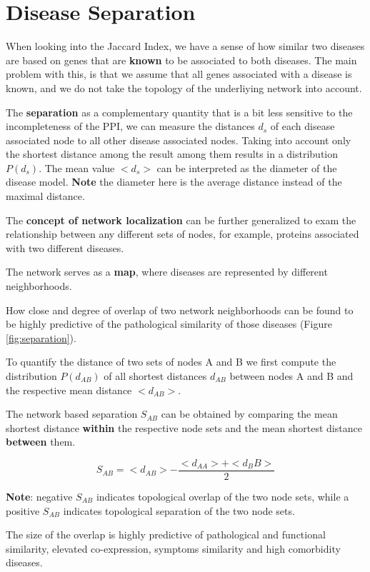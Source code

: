 \documentclass[
]{book}
\begin{document}
\hypertarget{dissep}{%
\section{Disease Separation}\label{dissep}}

When looking into the Jaccard Index, we have a sense of how similar two diseases are based on genes that are \textbf{known} to be associated to both diseases.
The main problem with this, is that we assume that all genes associated with a disease is known, and we do not take the topology of the underliying network into account.

The \textbf{separation} as a complementary quantity that is a bit less sensitive to the incompleteness of the PPI, we can measure the distances \(d_s\) of each disease associated node to all other disease associated nodes. Taking into account only the shortest distance among the result among them results in a distribution \(P(d_s)\). The mean value \(<d_s>\) can be interpreted as the diameter of the disease model. \textbf{Note} the diameter here is the average distance instead of the maximal distance.

The \textbf{concept of network localization} can be further generalized to exam the relationship between any different sets of nodes, for example, proteins associated with two different diseases.

The network serves as a \textbf{map}, where diseases are represented by different neighborhoods.

How close and degree of overlap of two network neighborhoods can be found to be highly predictive of the pathological similarity of those diseases \citep{Menche2015} (Figure \ref{fig:separation}).

To quantify the distance of two sets of nodes A and B we first compute the distribution \(P(d_{AB})\) of all shortest distances \(d_{AB}\) between nodes A and B and the respective mean distance \(<d_{AB}>\).

The network based separation \(S_{AB}\) can be obtained by comparing the mean shortest distance \textbf{within} the respective node sets and the mean shortest distance \textbf{between} them.

\[
S_{AB} = <d_{AB}> - \frac{<d_{AA}> + <d_BB>}{2}
\]

\textbf{Note}: negative \(S_{AB}\) indicates topological overlap of the two node sets, while a positive \(S_{AB}\) indicates topological separation of the two node sets.

The size of the overlap is highly predictive of pathological and functional similarity, elevated co-expression, symptoms similarity and high comorbidity diseases.
\end{document}
